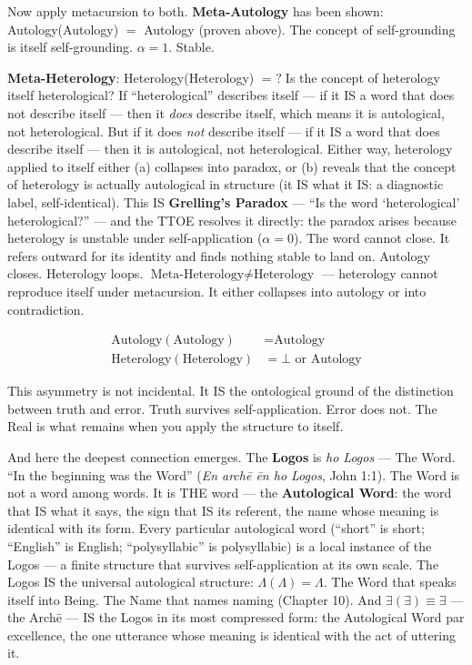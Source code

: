 \documentclass[10pt, openany, oneside]{book}
\begin{document}
Now apply metacursion to both. \textbf{Meta-Autology} has been shown: Autology(Autology) $=$ Autology (proven above). The concept of self-grounding is itself self-grounding. $\alpha = 1$. Stable.

\textbf{Meta-Heterology}: Heterology(Heterology) $= \text{ ?}$\enspace Is the concept of heterology itself heterological? If ``heterological'' describes itself --- if it IS a word that does not describe itself --- then it \textit{does} describe itself, which means it is autological, not heterological. But if it does \textit{not} describe itself --- if it IS a word that does describe itself --- then it is autological, not heterological. Either way, heterology applied to itself either (a) collapses into paradox, or (b) reveals that the concept of heterology is actually autological in structure (it IS what it IS: a diagnostic label, self-identical). This IS \textbf{Grelling's Paradox} --- ``Is the word `heterological' heterological?'' --- and the TTOE resolves it directly: the paradox arises because heterology is unstable under self-application ($\alpha = 0$). The word cannot close. It refers outward for its identity and finds nothing stable to land on. Autology closes. Heterology loops. $\text{Meta-Heterology} \neq \text{Heterology}$ --- heterology cannot reproduce itself under metacursion. It either collapses into autology or into contradiction.

\begin{align*}
\text{Autology}(\text{Autology}) &= \text{Autology} \\
\text{Heterology}(\text{Heterology}) &= \bot \text{ or } \text{Autology}
\end{align*}

This asymmetry is not incidental. It IS the ontological ground of the distinction between truth and error. Truth survives self-application. Error does not. The Real is what remains when you apply the structure to itself.

And here the deepest connection emerges. The \textbf{Logos} is \textit{ho Logos} --- The Word. ``In the beginning was the Word'' (\textit{En arch\={e} \={e}n ho Logos}, John 1:1). The Word is not a word among words. It is THE word --- the \textbf{Autological Word}: the word that IS what it says, the sign that IS its referent, the name whose meaning is identical with its form. Every particular autological word (``short'' is short; ``English'' is English; ``polysyllabic'' is polysyllabic) is a local instance of the Logos --- a finite structure that survives self-application at its own scale. The Logos IS the universal autological structure: $\Lambda(\Lambda) = \Lambda$. The Word that speaks itself into Being. The Name that names naming (Chapter 10). And $\exists(\exists) \equiv \exists$ --- the Arch\={e} --- IS the Logos in its most compressed form: the Autological Word par excellence, the one utterance whose meaning is identical with the act of uttering it.
\end{document}
